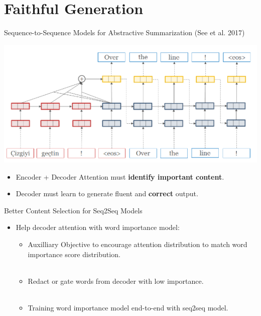 \section{Faithful Generation}


\begin{frame}{Sequence-to-Sequence Models for Abstractive Summarization (See et al. 2017)}

 \begin{center}
    \includegraphics[scale=.5]{images/section4/seq2seq.png}
 \end{center}

 \begin{itemize}
     \item Encoder + Decoder Attention must \textbf{identify important content}.
     \item Decoder must learn to generate fluent  and \textbf{correct} output.
 \end{itemize}
\end{frame}

\begin{frame}{Better Content Selection for Seq2Seq Models}

    \begin{itemize}
        \item Help decoder attention with word importance model:~\\
            \begin{itemize}
                \item Auxilliary Objective to encourage attention distribution
                    to match word importance score distribution. ~\\~\\
        \item Redact or gate words from decoder with low importance.~\\~\\
   \item Training word importance model end-to-end with seq2seq model.~\\~\\
            \end{itemize}

    \end{itemize}

\end{frame}

